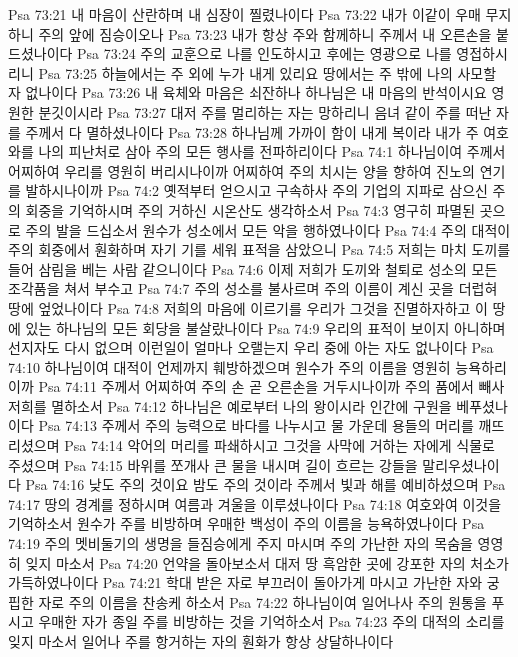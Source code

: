 Psa 73:21  내 마음이 산란하며 내 심장이 찔렸나이다
Psa 73:22  내가 이같이 우매 무지하니 주의 앞에 짐승이오나
Psa 73:23  내가 항상 주와 함께하니 주께서 내 오른손을 붙드셨나이다
Psa 73:24  주의 교훈으로 나를 인도하시고 후에는 영광으로 나를 영접하시리니
Psa 73:25  하늘에서는 주 외에 누가 내게 있리요 땅에서는 주 밖에 나의 사모할 자 없나이다
Psa 73:26  내 육체와 마음은 쇠잔하나 하나님은 내 마음의 반석이시요 영원한 분깃이시라
Psa 73:27  대저 주를 멀리하는 자는 망하리니 음녀 같이 주를 떠난 자를 주께서 다 멸하셨나이다
Psa 73:28  하나님께 가까이 함이 내게 복이라 내가 주 여호와를 나의 피난처로 삼아 주의 모든 행사를 전파하리이다
Psa 74:1  하나님이여 주께서 어찌하여 우리를 영원히 버리시나이까 어찌하여 주의 치시는 양을 향하여 진노의 연기를 발하시나이까
Psa 74:2  옛적부터 얻으시고 구속하사 주의 기업의 지파로 삼으신 주의 회중을 기억하시며 주의 거하신 시온산도 생각하소서
Psa 74:3  영구히 파멸된 곳으로 주의 발을 드십소서 원수가 성소에서 모든 악을 행하였나이다
Psa 74:4  주의 대적이 주의 회중에서 훤화하며 자기 기를 세워 표적을 삼았으니
Psa 74:5  저희는 마치 도끼를 들어 삼림을 베는 사람 같으니이다
Psa 74:6  이제 저희가 도끼와 철퇴로 성소의 모든 조각품을 쳐서 부수고
Psa 74:7  주의 성소를 불사르며 주의 이름이 계신 곳을 더럽혀 땅에 엎었나이다
Psa 74:8  저희의 마음에 이르기를 우리가 그것을 진멸하자하고 이 땅에 있는 하나님의 모든 회당을 불살랐나이다
Psa 74:9  우리의 표적이 보이지 아니하며 선지자도 다시 없으며 이런일이 얼마나 오랠는지 우리 중에 아는 자도 없나이다
Psa 74:10  하나님이여 대적이 언제까지 훼방하겠으며 원수가 주의 이름을 영원히 능욕하리이까
Psa 74:11  주께서 어찌하여 주의 손 곧 오른손을 거두시나이까 주의 품에서 빼사 저희를 멸하소서
Psa 74:12  하나님은 예로부터 나의 왕이시라 인간에 구원을 베푸셨나이다
Psa 74:13  주께서 주의 능력으로 바다를 나누시고 물 가운데 용들의 머리를 깨뜨리셨으며
Psa 74:14  악어의 머리를 파쇄하시고 그것을 사막에 거하는 자에게 식물로 주셨으며
Psa 74:15  바위를 쪼개사 큰 물을 내시며 길이 흐르는 강들을 말리우셨나이다
Psa 74:16  낮도 주의 것이요 밤도 주의 것이라 주께서 빛과 해를 예비하셨으며
Psa 74:17  땅의 경계를 정하시며 여름과 겨울을 이루셨나이다
Psa 74:18  여호와여 이것을 기억하소서 원수가 주를 비방하며 우매한 백성이 주의 이름을 능욕하였나이다
Psa 74:19  주의 멧비둘기의 생명을 들짐승에게 주지 마시며 주의 가난한 자의 목숨을 영영히 잊지 마소서
Psa 74:20  언약을 돌아보소서 대저 땅 흑암한 곳에 강포한 자의 처소가 가득하였나이다
Psa 74:21  학대 받은 자로 부끄러이 돌아가게 마시고 가난한 자와 궁핍한 자로 주의 이름을 찬송케 하소서
Psa 74:22  하나님이여 일어나사 주의 원통을 푸시고 우매한 자가 종일 주를 비방하는 것을 기억하소서
Psa 74:23  주의 대적의 소리를 잊지 마소서 일어나 주를 항거하는 자의 훤화가 항상 상달하나이다
